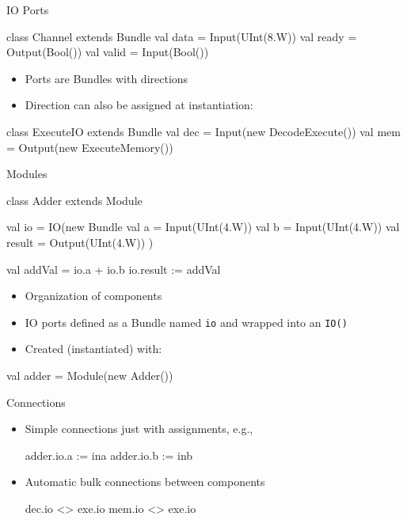 \documentclass[xcolor=pdflatex,dvipsnames,table]{beamer}
\newcommand{\code}[1]{{\texttt{#1}}}
\begin{document}
\begin{frame}[fragile]{IO Ports}
\begin{chisel}
class Channel extends Bundle {
  val data = Input(UInt(8.W))
  val ready = Output(Bool())
  val valid = Input(Bool())
}
\end{chisel}
\begin{itemize}
\item Ports are Bundles with directions
\item Direction can also be assigned at instantiation:
\end{itemize}
\begin{chisel}
class ExecuteIO extends Bundle {
  val dec = Input(new DecodeExecute())
  val mem = Output(new ExecuteMemory())
}
\end{chisel}
\end{frame}

\begin{frame}[fragile]{Modules}
\begin{chisel}
class Adder extends Module {
  val io = IO(new Bundle {
    val a = Input(UInt(4.W))
    val b = Input(UInt(4.W))
    val result = Output(UInt(4.W))
  })

  val addVal = io.a + io.b
  io.result := addVal
}
\end{chisel}
\begin{itemize}
\item Organization of components
\item IO ports defined as a Bundle named \code{io} and wrapped into an \code{IO()}
\item Created (instantiated) with:
\end{itemize}
\begin{chisel}
val adder = Module(new Adder())
\end{chisel}
\end{frame}

\begin{frame}[fragile]{Connections}
\begin{itemize}
\item Simple connections just with assignments, e.g.,
\begin{chisel}
  adder.io.a := ina
  adder.io.b := inb
\end{chisel}
\item Automatic bulk connections between components
\begin{chisel}
  dec.io <> exe.io
  mem.io <> exe.io
\end{chisel}
\end{itemize}
\end{frame}
\end{document}

